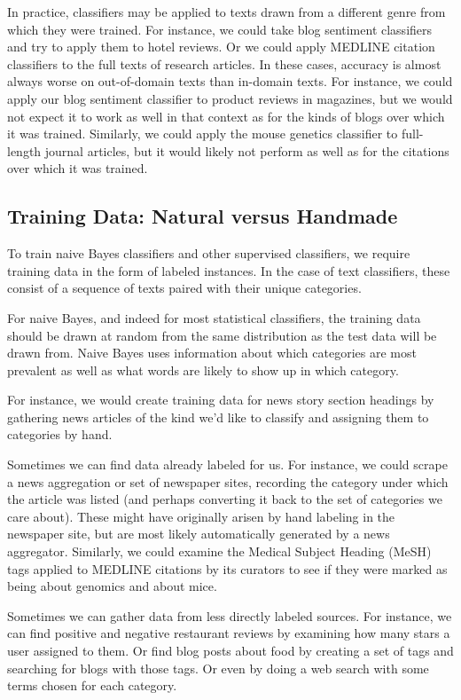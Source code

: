 In practice, classifiers may be applied to texts drawn from a
different genre from which they were trained.  For instance, we could
take blog sentiment classifiers and try to apply them to hotel
reviews.  Or we could apply MEDLINE citation classifiers to the full
texts of research articles.  In these cases, accuracy is almost always
worse on out-of-domain texts than in-domain texts.  For instance, we
could apply our blog sentiment classifier to product reviews in
magazines, but we would not expect it to work as well in that context
as for the kinds of blogs over which it was trained.  Similarly, we
could apply the mouse genetics classifier to full-length journal
articles, but it would likely not perform as well as for the citations
over which it was trained.

\subsection{Training Data: Natural versus Handmade}

To train naive Bayes classifiers and other supervised classifiers, we
require training data in the form of labeled instances.  In the case
of text classifiers, these consist of a sequence of texts paired with
their unique categories.  

For naive Bayes, and indeed for most statistical classifiers, the
training data should be drawn at random from the same distribution as
the test data will be drawn from.  Naive Bayes uses information about
which categories are most prevalent as well as what words are likely
to show up in which category.

For instance, we would create training data for news story section
headings by gathering news articles of the kind we'd like to classify
and assigning them to categories by hand. 

Sometimes we can find data already labeled for us.  For instance, we
could scrape a news aggregation or set of newspaper sites, recording
the category under which the article was listed (and perhaps
converting it back to the set of categories we care about).  These
might have originally arisen by hand labeling in the newspaper site,
but are most likely automatically generated by a news aggregator.
Similarly, we could examine the Medical Subject Heading (MeSH) tags
applied to MEDLINE citations by its curators to see if they were
marked as being about genomics and about mice.  

Sometimes we can gather data from less directly labeled sources.  For
instance, we can find positive and negative restaurant reviews by
examining how many stars a user assigned to them.  Or find blog posts
about food by creating a set of tags and searching for blogs with
those tags.  Or even by doing a web search with some terms chosen
for each category.

